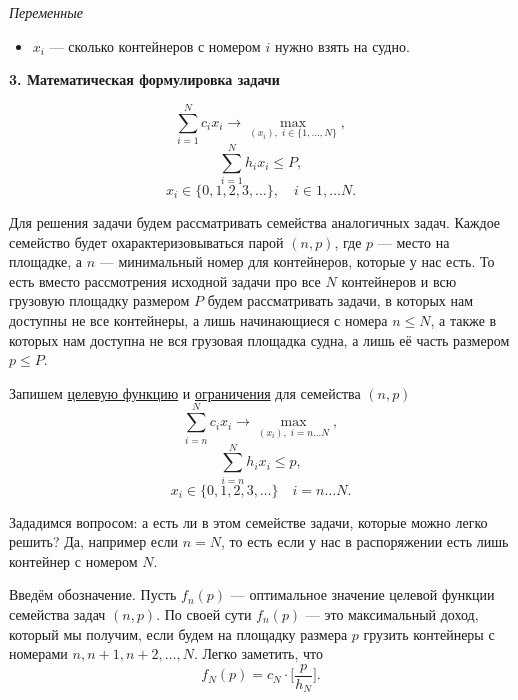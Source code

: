 \bigskip

\textit{Переменные}
\begin{itemize}[nosep]
	\item $x_i$ --- сколько контейнеров с номером $i$ нужно взять на судно.
\end{itemize}

\begin{figure}[H]
	\centering
	\def\svgwidth{\linewidth}
	\fbox{}
\end{figure}

\bigskip

\textbf{3. Математическая формулировка задачи}

\[
\sum_{i=1}^{N} c_i x_i \to \max_{(x_i), \; i \in \{1, \dots, N\}},
\]
\[
\sum_{i=1}^{N} h_i x_i \le P,
\]
\[
x_i \in \{0, 1, 2, 3, \dots\}, \quad i \in {1, \dots N}.
\]

\solution

Для решения задачи будем рассматривать семейства аналогичных задач. Каждое семейство будет охарактеризовываться парой $(n, p)$, где $p$ --- место на площадке, а $n$ --- минимальный номер для контейнеров, которые у нас есть. То есть вместо рассмотрения исходной задачи про все $N$ контейнеров и всю грузовую площадку размером $P$ будем рассматривать задачи, в которых нам доступны не все контейнеры, а лишь начинающиеся с номера $n \le N$, а также в которых нам доступна не вся грузовая площадка судна, а лишь её часть размером $p \le P$.

\begin{figure}[H]
	\centering
	\def\svgwidth{\linewidth}
	\fbox{}
\end{figure}

Запишем \underline{целевую функцию} и \underline{ограничения} для семейства $(n, p)$
\[
\sum_{i=n}^{N} c_i x_i \to \max_{(x_i), \; i=n \dots N},
\]
\[
\sum_{i=n}^{N} h_i x_i \le p,
\]
\[
x_i \in \{0, 1, 2, 3, \dots\} \quad i = n \dots N.
\]

Зададимся вопросом: а есть ли в этом семействе задачи, которые можно легко решить? Да, например если $n = N$, то есть если у нас в распоряжении есть лишь контейнер с номером $N$.

Введём обозначение. Пусть $f_n(p)$ --- оптимальное значение целевой функции семейства задач $(n, p)$. По своей сути $f_n(p)$ --- это максимальный доход, который мы получим, если будем на площадку размера $p$ грузить контейнеры с номерами $n, n+1, n+2, \dots, N$. Легко заметить, что
\[
f_N(p) = c_N \cdot \bigg[\frac{p}{h_N}\bigg].
\]

